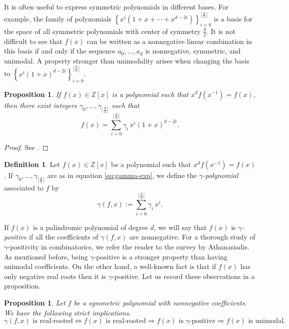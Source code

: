 \documentclass[11pt, a4paper, english]{amsart}
\theoremstyle{teoremas}
\newtheorem{proposition}[theorem]{Proposition}
\theoremstyle{definition}
\newtheorem{definition}[theorem]{Definition}
\newcommand{\Z}{\mathbb{Z}}
\begin{document}
It is often useful to express symmetric polynomials in different bases. For example, the family of polynomials $\left\{x^i(1+x+\cdots+x^{d-2i})\right\}_{i=0}^{\lfloor\frac{d}{2}\rfloor}$ is a basis for the space of all symmetric polynomials with center of symmetry $\frac{d}{2}$. It is not difficult to see that $f(x)$ can be written as a nonnegative linear combination in this basis if and only if the sequence $a_0,\ldots, a_d$ is nonnegative, symmetric, and unimodal. A property stronger than unimodality arises when changing the basis to $\left\{x^i(1+x)^{d-2i}\right\}_{i=0}^{\lfloor\frac{d}{2}\rfloor}$.

\begin{proposition}
    If $f(x)\in \mathbb{Z}[x]$ is a polynomial such that $x^df(x^{-1})=f(x)$, then there exist integers $\gamma_0,\ldots,\gamma_{\lfloor \frac{d}{2}\rfloor}$ such that
    \begin{equation}\label{eq:gamma-exp} 
        f(x) = \sum_{i=0}^{\lfloor\frac{d}{2}\rfloor} \gamma_i\, x^i (1+x)^{d-2i}.
    \end{equation}
\end{proposition}
 

\begin{proof}
    See \cite[Proposition~2.1.1]{gal}.
\end{proof}

\begin{definition}
    Let $f(x) \in \Z[x]$ be a polynomial such that $x^df(x^{-1})=f(x)$. If $\gamma_0,\ldots,\gamma_{\lfloor\frac{d}{2}\rfloor}$ are as in equation \eqref{eq:gamma-exp}, we define the \emph{$\gamma$-polynomial} associated to $f$ by
        \[\gamma(f,x) := \sum_{i=0}^{\lfloor\frac{d}{2}\rfloor} \gamma_i\, x^i.\]
\end{definition}

If $f(x)$ is a palindromic polynomial of degree $d$, we will say that $f(x)$ is \emph{$\gamma$-positive} if all the coefficients of $\gamma(f,x)$ are nonnegative. For a thorough study of $\gamma$-positivity in combinatorics, we refer the reader to the survey \cite{athanasiadis-gamma-positivity} by Athanasiadis. As mentioned before, being $\gamma$-positive is a stronger property than having unimodal coefficients. On the other hand, a well-known fact is that if $f(x)$ has only negative real roots then it is $\gamma$-positive. Let us record these observations in a proposition.

\begin{proposition}
    Let $f$ be a symmetric polynomial with nonnegative coefficients. We have the following strict implications.
    \[\gamma(f,x) \text{ is real-rooted} \iff f(x) \text{ is real-rooted} \Longrightarrow f(x) \text{  is $\gamma$-positive} \Longrightarrow f(x) \text{ is unimodal.}\]
\end{proposition}
\end{document}
